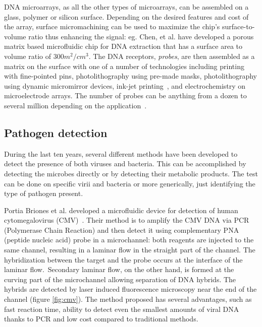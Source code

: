 \documentclass[12pt]{article}
\begin{document}
DNA microarrays, as all the other types of microarrays, can be assembled on a glass, polymer or silicon 
surface. Depending on the desired features and cost of the array, surface micromachining can be used
to maximize the chip's surface-to-volume ratio thus enhancing the signal: eg. Chen, et al. have developed
a porous matrix based microfluidic chip for DNA extraction that has a surface area to volume ratio of
$300 m^2/cm^3$. The DNA receptors, \textit{probes}, are then assembled as a matrix on the surface
with one of a number of technologies including printing with fine-pointed pins,
photolithography using pre-made masks, photolithography using dynamic micromirror devices, ink-jet 
printing~\cite{LAUSTED_2004}, and electrochemistry on microelectrode arrays. The number of probes can
be anything from a dozen to several million depending on the application~\cite{KIM_2005}.

\subsection{Pathogen detection}
During the last ten years, several different methods have been developed to detect the presence of 
both viruses and bacteria. This can be accomplished by detecting the microbes directly or by
detecting their metabolic products. The test can be done on specific virii and bacteria or more
generically, just identifying the type of pathogen present.

Portia Briones et al. developed a microfluidic device for detection of human cytomegalovirus (CMV)~\cite{BRIONES_2006}.
Their method is to amplify the CMV DNA via PCR (Polymerase Chain Reaction) and then detect it using
complementary PNA (peptide nucleic acid) probe in a microchannel: both reagents are injected to the
same channel, resulting in a laminar flow in the straight part of the channel. The hybridization between the target and the probe 
occurs at the interface of the laminar flow. Secondary laminar flow, on the other hand, is formed at the
curving part of the microchannel allowing separation of DNA hybrids. The hybrids are detected by laser induced
fluorescence microscopy near the end of the channel (figure \ref{fig:cmv}). The method proposed has several
advantages, such as fast reaction time, ability to detect even the smallest amounts of viral DNA thanks to
PCR and low cost compared to traditional methods.
\end{document}
